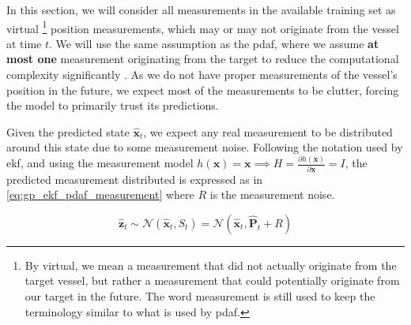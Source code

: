 In this section, we will consider all measurements in the available training set as virtual \footnote{By virtual, we mean a measurement that did not actually originate from the target vessel, but rather a measurement that could potentially originate from our target in the future. The word measurement is still used to keep the terminology similar to what is used by \acrshort{pdaf}.} position measurements, which may or may not originate from the vessel at time $t$. We will use the same assumption as the \acrshort{pdaf}, where we assume \textbf{at most one} measurement originating from the target to reduce the computational complexity significantly \cite{sensorfusjon}. As we do not have proper measurements of the vessel's position in the future, we expect most of the measurements to be clutter, forcing the model to primarily trust its predictions. 

Given the predicted state $\hat{\boldsymbol{x}}_t$, we expect any real measurement to be distributed around this state due to some measurement noise. Following the notation used by \acrshort{ekf}, and using the measurement model $h(\boldsymbol{x}) = \boldsymbol{x} \implies H = \frac{\partial h (\boldsymbol{x})}{\partial \boldsymbol{x}} = I$, the predicted measurement distributed is expressed as in \cref{eq:gp_ekf_pdaf_measurement} where $R$ is the measurement noise.

\begin{equation} \label{eq:gp_ekf_pdaf_measurement}
    \hat{\boldsymbol{z}}_t \sim \mathcal{N}(\hat{\boldsymbol{x}}_t, S_{t}) = \mathcal{N}(\hat{\boldsymbol{x}}_t, \hat{\boldsymbol{P}}_t + R)
\end{equation}

